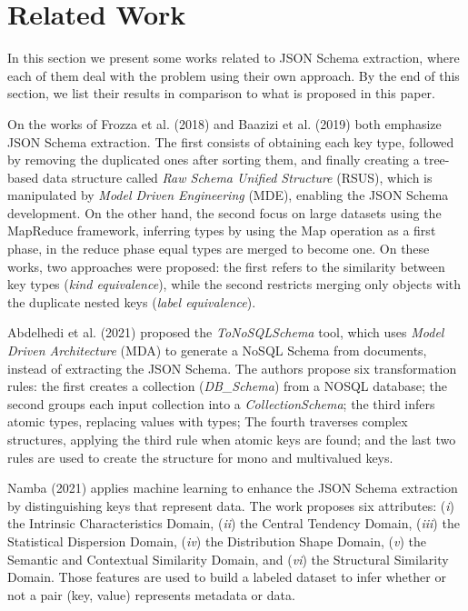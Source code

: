 \section{Related Work}
\label{sec:RW}

In this section we present some works related to JSON Schema extraction, where each of them deal with the problem using their own approach. By the end of this section, we list their results in comparison to what is proposed in this paper.

On the works of Frozza et al. (2018) \nocite{frozza2018approach} and Baazizi et al. (2019) \nocite{baazizi2019parametric} both emphasize JSON Schema extraction. The first consists of obtaining each key type, followed by removing the duplicated ones after sorting them, and finally creating a tree-based data structure called \textit{Raw Schema Unified Structure} (RSUS), which is manipulated by \textit{Model Driven Engineering} (MDE), enabling the JSON Schema development. On the other hand, the second focus on large datasets using the MapReduce framework, inferring types by using the Map operation as a first phase, in the reduce phase equal types are merged to become one. On these works, two approaches were proposed: the first refers to the similarity between key types (\textit{kind equivalence}), while the second restricts merging only objects with the duplicate nested keys (\textit{label equivalence}). 

Abdelhedi et al. (2021) \nocite{abdelhedi2021automatic} proposed the \textit{ToNoSQLSchema} tool, which uses \textit{Model Driven Architecture} (MDA) to generate a NoSQL Schema from documents, instead of extracting the JSON Schema. The authors propose six transformation rules: the first creates a collection (\textit{DB\_Schema}) from a NOSQL database; the second groups each input collection into a \textit{CollectionSchema}; the third infers atomic types, replacing values with types; The fourth traverses complex structures, applying the third rule when atomic keys are found; and the last two rules are used to create the structure for mono and multivalued keys.

Namba (2021) \nocite{Nam21} applies machine learning to enhance the JSON Schema extraction by distinguishing keys that represent data. The work proposes six attributes: (\textit{i}) the Intrinsic Characteristics Domain, (\textit{ii}) the Central Tendency Domain, (\textit{iii}) the Statistical Dispersion Domain, (\textit{iv}) the Distribution Shape Domain, (\textit{v}) the Semantic and Contextual Similarity Domain, and (\textit{vi}) the Structural Similarity Domain. Those features are used to build a labeled dataset to infer whether or not a pair (key, value) represents metadata or data.

